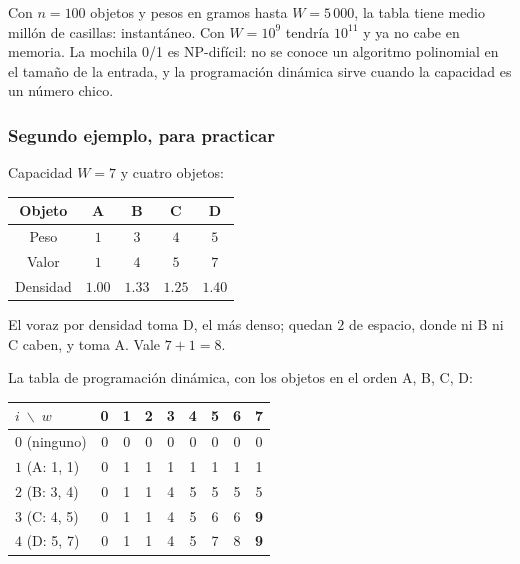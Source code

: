 \documentclass[11pt,letterpaper]{article}
\begin{document}
\begin{ojo}
  Con $n = 100$ objetos y pesos en gramos hasta $W = 5\,000$, la tabla
  tiene medio millón de casillas: instantáneo. Con $W = 10^{9}$ tendría
  $10^{11}$ y ya no cabe en memoria. La mochila 0/1 es NP-difícil: no
  se conoce un algoritmo polinomial en el tamaño de la entrada, y la
  programación dinámica sirve cuando la capacidad es un número chico.
\end{ojo}

\subsubsection*{Segundo ejemplo, para practicar}

Capacidad $W = 7$ y cuatro objetos:

\begin{center}
\begin{tabular}{ccccc}
  \toprule
  \textbf{Objeto} & \textbf{A} & \textbf{B} & \textbf{C} & \textbf{D} \\
  \midrule
  Peso      & $1$ & $3$ & $4$ & $5$ \\
  Valor     & $1$ & $4$ & $5$ & $7$ \\
  Densidad  & $1.00$ & $1.33$ & $1.25$ & $1.40$ \\
  \bottomrule
\end{tabular}
\end{center}

El voraz por densidad toma D, el más denso; quedan $2$ de espacio,
donde ni B ni C caben, y toma A. Vale $7 + 1 = 8$.

La tabla de programación dinámica, con los objetos en el orden A, B,
C, D:

\begin{center}
\begin{tabular}{l*{8}{c}}
  \toprule
  $i \;\backslash\; w$ & 0 & 1 & 2 & 3 & 4 & 5 & 6 & 7 \\
  \midrule
  $0$ (ninguno) & 0 & 0 & 0 & 0 & 0 & 0 & 0 & 0 \\
  $1$ (A: 1, 1) & 0 & 1 & 1 & 1 & 1 & 1 & 1 & 1 \\
  $2$ (B: 3, 4) & 0 & 1 & 1 & 4 & 5 & 5 & 5 & 5 \\
  $3$ (C: 4, 5) & 0 & 1 & 1 & 4 & 5 & 6 & 6 & \textbf{9} \\
  $4$ (D: 5, 7) & 0 & 1 & 1 & 4 & 5 & 7 & 8 & \textbf{9} \\
  \bottomrule
\end{tabular}
\end{center}
\end{document}
